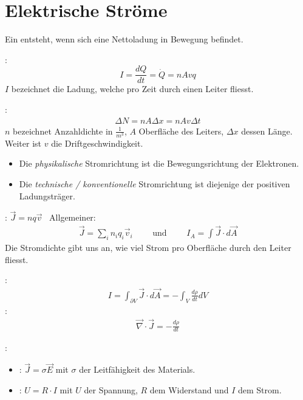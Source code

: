 \section{Elektrische Ströme}

\vspace{1\baselineskip}

Ein  entsteht, wenn sich eine Nettoladung in Bewegung befindet.

\vspace{1\baselineskip}

:
\[
    I = \frac{dQ}{dt} = \dot{Q} = n A v q
\]
$I$ bezeichnet die Ladung, welche pro Zeit durch einen Leiter fliesst.

\vspace{1\baselineskip}

:
\begin{align*}
    \Delta N = n A \Delta x = n A v \Delta t
\end{align*}
$n$ bezeichnet Anzahldichte in $\frac{1}{m^3}$, $A$ Oberfläche des Leiters, $\Delta x$
dessen Länge. Weiter ist $v$ die Driftgeschwindigkeit.

\vspace{1\baselineskip}

\begin{itemize}
    \item Die \textit{physikalische} Stromrichtung ist die Bewegungsrichtung der Elektronen.
    \item Die \textit{technische / konventionelle} Stromrichtung ist diejenige der positiven Ladungsträger.
\end{itemize}

\pagebreak

: $\vec{J} = n q \vec{v}$ \
Allgemeiner:
\begin{align*}
    \vec{J} = \sum_i n_i q_i \vec{v}_i
    \quad \quad \text{  und  } \quad \quad
    I_A = \int \vec{J} \cdot d \vec{A}
\end{align*}
Die Stromdichte gibt uns an, wie viel Strom pro Oberfläche durch den Leiter fliesst.

\vspace{1\baselineskip}

:
\begin{align*}
    I = \int_{\partial V} \vec{J} \cdot d \vec{A} = - \int_V \frac{d \rho}{d t} dV
\end{align*}
:
\begin{align*}
    \vec{\nabla} \cdot \vec{J} = - \frac{d \rho}{d t}
\end{align*}

\vspace{1\baselineskip}

:
\begin{itemize}
    \item {}: $\vec{J} = \sigma \vec{E}$ mit $\sigma$ der Leitfähigkeit des Materials.
    \item \fat{idealisiert}: $U = R \cdot I$ mit $U$ der Spannung, $R$ dem Widerstand und $I$ dem Strom.
\end{itemize}

